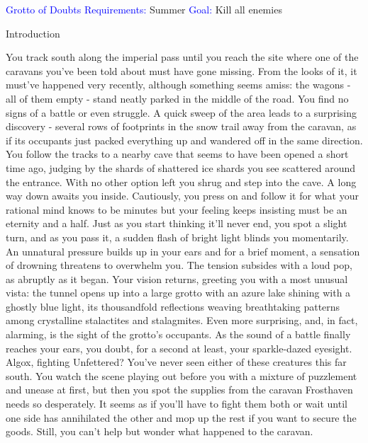 \documentclass[fontsize=11pt]{scrartcl}
\begin{document}
  \BgThispage
	\vspace*{0cm} \hskip 3cm \textcolor{Blue}{\LARGE{Grotto of Doubts}}\newline\newline
	\vspace*{0cm} \LARGE{\textcolor{Blue}{Requirements:}} \normalsize{Summer}\newline
	\vspace*{0cm} \LARGE{\textcolor{Blue}{Goal:}} \normalsize{Kill all enemies}\newline\newline
	\begin{multicols}{3}
	  \begin{center}
		  \LARGE{\textcolor{OliveGreen}{Introduction}}
		\end{center}
    \footnotesize{You track south along the imperial pass until you reach the site where one of the caravans you’ve been told about must have gone missing. From the looks of it, it must’ve happened very recently, although something seems amiss: the wagons - all of them empty - stand neatly parked in the middle of the road. You find no signs of a battle or even struggle. A quick sweep of the area leads to a surprising discovery - several rows of footprints in the snow trail away from the caravan, as if its occupants just packed everything up and wandered off in the same direction. You follow the tracks to a nearby cave that seems to have been opened a short time ago, judging by the shards of shattered ice shards you see scattered around the entrance.\newline\newline
With no other option left you shrug and step into the cave. A long way down awaits you inside. Cautiously, you press on and follow it for what your rational mind knows to be minutes but your feeling keeps insisting must be an eternity and a half. Just as you start thinking it’ll never end, you spot a slight turn, and as you pass it, a sudden flash of bright light blinds you momentarily. An unnatural pressure builds up in your ears and for a brief moment, a sensation of drowning threatens to overwhelm you. The tension subsides with a loud pop, as abruptly as it began.\newline\newline
Your vision returns, greeting you with a most unusual vista: the tunnel opens up into a large grotto with an azure lake shining with a ghostly blue light, its thousandfold reflections weaving breathtaking patterns among crystalline stalactites and stalagmites. Even more surprising, and, in fact, alarming, is the sight of the grotto’s occupants. As the sound of a battle finally reaches your ears, you doubt, for a second at least, your sparkle-dazed eyesight. Algox, fighting Unfettered? You’ve never seen either of these creatures this far south. You watch the scene playing out before you with a mixture of puzzlement and unease at first, but then you spot the supplies from the caravan Frosthaven needs so desperately. It seems as if you’ll have to fight them both or wait until one side has annihilated the other and mop up the rest if you want to secure the goods. Still, you can’t help but wonder what happened to the caravan.}

\end{multicols}
\end{document}
